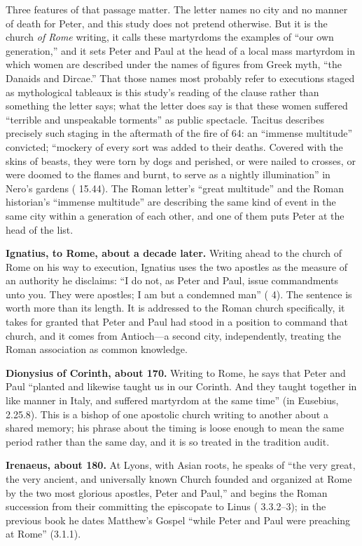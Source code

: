 Three features of that passage matter. The letter names no city and no manner
of death for Peter, and this study does not pretend otherwise. But it is the
church \emph{of Rome} writing, it calls these martyrdoms the examples of
``our own generation,'' and it sets Peter and Paul at the head of a local
mass martyrdom in which women are described under the names of figures from
Greek myth, ``the Danaids and Dircae.'' That those names most probably refer
to executions staged as mythological tableaux is this study's reading of the
clause rather than something the letter says; what the letter does say is
that these women suffered ``terrible and unspeakable torments'' as public
spectacle. Tacitus describes precisely such staging in the aftermath of the
fire of 64: an ``immense multitude'' convicted; ``mockery of every
sort was added to their deaths. Covered with the skins of beasts, they were
torn by dogs and perished, or were nailed to crosses, or were doomed to the
flames and burnt, to serve as a nightly illumination'' in Nero's gardens
( 15.44). The Roman letter's ``great multitude'' and the Roman
historian's ``immense multitude'' are describing the same kind of event in
the same city within a generation of each other, and one of them puts Peter
at the head of the list.

\textbf{Ignatius, to Rome, about a decade later.} Writing ahead to the church
of Rome on his way to execution, Ignatius uses the two apostles as the
measure of an authority he disclaims: ``I do not, as Peter and Paul, issue
commandments unto you. They were apostles; I am but a condemned man''
( 4). The sentence is worth more than its length. It is
addressed to the Roman church specifically, it takes for granted that Peter
and Paul had stood in a position to command that church, and it comes from
Antioch---a second city, independently, treating the Roman association as
common knowledge.

\textbf{Dionysius of Corinth, about 170.} Writing to Rome, he says that Peter
and Paul ``planted and likewise taught us in our Corinth. And they taught
together in like manner in Italy, and suffered martyrdom at the same time''
(in Eusebius,  2.25.8). This is a bishop of one apostolic
church writing to another about a shared memory; his phrase about the timing
is loose enough to mean the same period rather than the same day, and it is
so treated in the tradition audit.

\textbf{Irenaeus, about 180.} At Lyons, with Asian roots, he speaks of ``the
very great, the very ancient, and universally known Church founded and
organized at Rome by the two most glorious apostles, Peter and Paul,'' and
begins the Roman succession from their committing the episcopate to Linus
( 3.3.2--3); in the previous book he dates Matthew's
Gospel ``while Peter and Paul were preaching at Rome'' (3.1.1).

